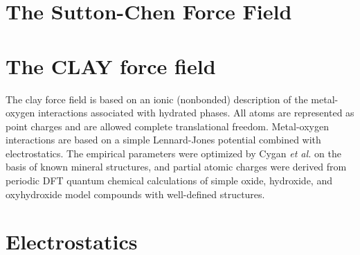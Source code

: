 \documentclass[]{book}
\begin{document}
\section{\label{section:sc}The Sutton-Chen Force Field}


\section{\label{section:clay}The CLAY force field}

The {\sc clay} force field is based on an ionic (nonbonded)
description of the metal-oxygen interactions associated with hydrated
phases. All atoms are represented as point charges and are allowed
complete translational freedom. Metal-oxygen interactions are based on
a simple Lennard-Jones potential combined with electrostatics. The
empirical parameters were optimized by Cygan {\it et
al.}\cite{Cygan04} on the basis of known mineral structures, and
partial atomic charges were derived from periodic DFT quantum chemical
calculations of simple oxide, hydroxide, and oxyhydroxide model
compounds with well-defined structures.


\section{\label{section:electrostatics}Electrostatics}
\end{document}
